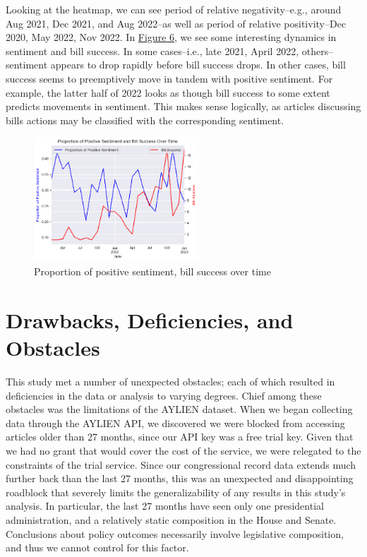 \documentclass[letterpaper,11pt]{article}
\begin{document}
Looking at the heatmap, we can see period of relative negativity--e.g., around Aug 2021, Dec 2021, and Aug 2022--as well as period of relative positivity--Dec 2020, May 2022, Nov 2022. In \hyperref[fig:prop-sent-time]{Figure 6}, we see some interesting dynamics in sentiment and bill success. In some cases--i.e., late 2021, April 2022, others--sentiment appears to drop rapidly before bill success drops. In other cases, bill success seems to preemptively move in tandem with positive sentiment. For example, the latter half of 2022 looks as though bill success to some extent predicts movements in sentiment. This makes sense logically, as articles discussing bills actions may be classified with the corresponding sentiment.

\begin{figure}[htbp]
    \centering
    \includegraphics[width=0.55\textwidth]{figs/fig_9.png}
    \caption{Proportion of positive sentiment, bill success over time}
    \label{fig:prop-sent-time}
\end{figure}



\section{Drawbacks, Deficiencies, and Obstacles}

\vspace{.1in}

\quad This study met a number of unexpected obstacles; each of which resulted in deficiencies in the data or analysis to varying degrees. Chief among these obstacles was the limitations of the AYLIEN dataset. When we began collecting data through the AYLIEN API, we discovered we were blocked from accessing articles older than 27 months, since our API key was a free trial key. Given that we had no grant that would cover the cost of the service, we were relegated to the constraints of the trial service. Since our congressional record data extends much further back than the last 27 months, this was an unexpected and disappointing roadblock that severely limits the generalizability of any results in this study's analysis. In particular, the last 27 months have seen only one presidential administration, and a relatively static composition in the House and Senate. Conclusions about policy outcomes necessarily involve legislative composition, and thus we cannot control for this factor.
\end{document}
